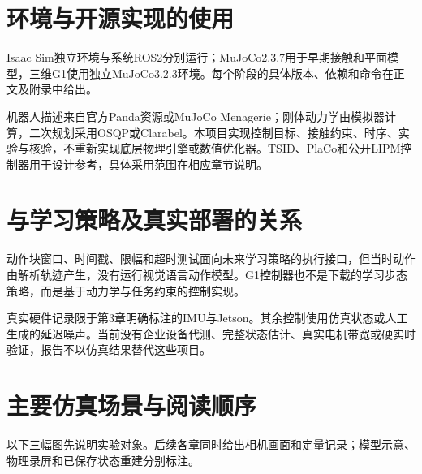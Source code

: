 \section{环境与开源实现的使用}
Isaac Sim独立环境与系统ROS2分别运行；MuJoCo2.3.7用于早期接触和平面模型，三维G1使用独立MuJoCo3.2.3环境。每个阶段的具体版本、依赖和命令在正文及附录中给出。

机器人描述来自官方Panda资源或MuJoCo Menagerie；刚体动力学由模拟器计算，二次规划采用OSQP或Clarabel。本项目实现控制目标、接触约束、时序、实验与核验，不重新实现底层物理引擎或数值优化器。TSID、PlaCo和公开LIPM控制器用于设计参考，具体采用范围在相应章节说明。
\section{与学习策略及真实部署的关系}
动作块窗口、时间戳、限幅和超时测试面向未来学习策略的执行接口，但当时动作由解析轨迹产生，没有运行视觉语言动作模型。G1控制器也不是下载的学习步态策略，而是基于动力学与任务约束的控制实现。

真实硬件记录限于第3章明确标注的IMU与Jetson。其余控制使用仿真状态或人工生成的延迟噪声。当前没有企业设备代测、完整状态估计、真实电机带宽或硬实时验证，报告不以仿真结果替代这些项目。


\section{主要仿真场景与阅读顺序}
以下三幅图先说明实验对象。后续各章同时给出相机画面和定量记录；模型示意、物理录屏和已保存状态重建分别标注。




